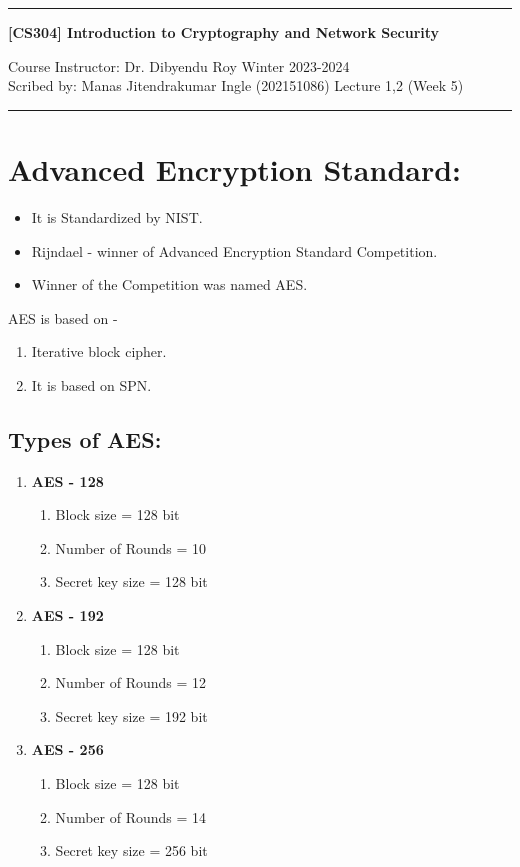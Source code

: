 \documentclass[11pt]{article}
\begin{document}
\noindent
\rule{\textwidth}{1pt}
\begin{center}
{\bf [CS304] Introduction to Cryptography and Network Security}
\end{center}
Course Instructor: Dr. Dibyendu Roy \hfill Winter 2023-2024\\
Scribed by: Manas Jitendrakumar Ingle (202151086) \hfill Lecture 1,2 (Week 5)
\\
\rule{\textwidth}{1pt}

\section{Advanced Encryption Standard:}
\begin{itemize}
    \item It is Standardized by NIST.
    \item Rijndael - winner of Advanced Encryption Standard Competition.
    \item Winner of the Competition was named AES.
\end{itemize}
AES is based on -
\begin{enumerate}
    \item Iterative block cipher.
    \item It is based on SPN.
\end{enumerate}
\subsection*{Types of AES:}
\begin{enumerate}
    \item \textbf{AES - 128}
    \begin{enumerate}
        \item Block size = 128 bit
        \item Number of Rounds = 10
        \item Secret key size = 128 bit
    \end{enumerate}
    \item \textbf{AES - 192}
    \begin{enumerate}
        \item Block size = 128 bit
        \item Number of Rounds = 12
        \item Secret key size = 192 bit
    \end{enumerate}
    \item \textbf{AES - 256}
    \begin{enumerate}
        \item Block size = 128 bit
        \item Number of Rounds = 14
        \item Secret key size = 256 bit
    \end{enumerate}
\end{enumerate}
\end{document}
